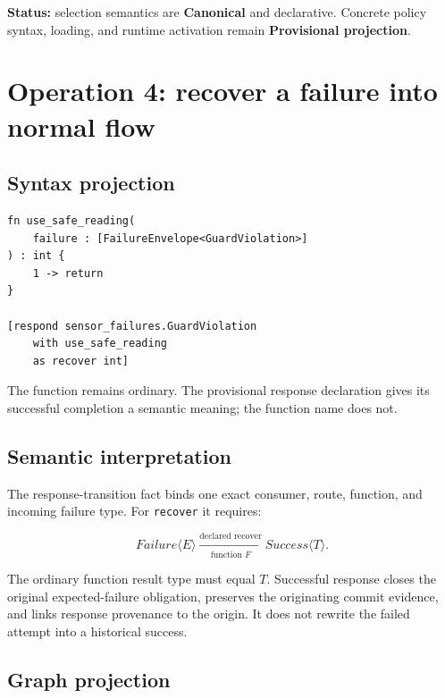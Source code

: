 \documentclass[11pt,a4paper]{article}
\newcommand{\canonical}{\textcolor{LyraGreen}{\textbf{Canonical}}\xspace}
\newcommand{\provisional}{\textcolor{LyraAmber}{\textbf{Provisional projection}}\xspace}
\newcommand{\code}[1]{\texttt{#1}}
\begin{document}
\textbf{Status:} selection semantics are \canonical and declarative. Concrete
policy syntax, loading, and runtime activation remain \provisional.

\section{Operation 4: recover a failure into normal flow}

\subsection*{Syntax projection}

\begin{lstlisting}[style=lyraform]
fn use_safe_reading(
    failure : [FailureEnvelope<GuardViolation>]
) : int {
    1 -> return
}

[respond sensor_failures.GuardViolation
    with use_safe_reading
    as recover int]
\end{lstlisting}

The function remains ordinary. The provisional response declaration gives its
successful completion a semantic meaning; the function name does not.

\subsection*{Semantic interpretation}

The response-transition fact binds one exact consumer, route, function, and
incoming failure type. For \code{recover} it requires:

\[
  Failure\langle E\rangle
  \xrightarrow[\text{function }F]{\text{declared recover}}
  Success\langle T\rangle .
\]

The ordinary function result type must equal $T$. Successful response closes
the original expected-failure obligation, preserves the originating commit
evidence, and links response provenance to the origin. It does not rewrite the
failed attempt into a historical success.

\subsection*{Graph projection}
\end{document}
